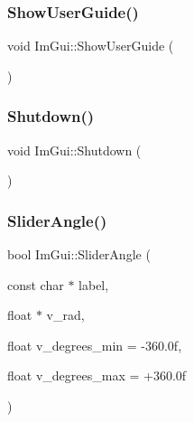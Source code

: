 \subsubsection{\texorpdfstring{Show\+User\+Guide()}{ShowUserGuide()}}
{\footnotesize\ttfamily void Im\+Gui\+::\+Show\+User\+Guide (\begin{DoxyParamCaption}{ }\end{DoxyParamCaption})}

\mbox{\label{namespace_im_gui_aeba34069558d4fbcf734a9c92ce3b773}} 
\subsubsection{\texorpdfstring{Shutdown()}{Shutdown()}}
{\footnotesize\ttfamily void Im\+Gui\+::\+Shutdown (\begin{DoxyParamCaption}{ }\end{DoxyParamCaption})}

\mbox{\label{namespace_im_gui_ad20170a9fff4ded0076476dad8ec6645}} 
\subsubsection{\texorpdfstring{Slider\+Angle()}{SliderAngle()}}
{\footnotesize\ttfamily bool Im\+Gui\+::\+Slider\+Angle (\begin{DoxyParamCaption}\item[{const char $\ast$}]{label,  }\item[{float $\ast$}]{v\+\_\+rad,  }\item[{float}]{v\+\_\+degrees\+\_\+min = {\ttfamily -\/360.0f},  }\item[{float}]{v\+\_\+degrees\+\_\+max = {\ttfamily +360.0f} }\end{DoxyParamCaption})}

\mbox{\label{namespace_im_gui_a3d3b2964eeba76dadaa532232c23fc97}} 
